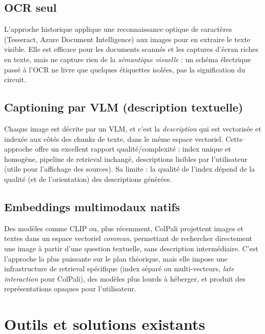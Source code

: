 \subsection{OCR seul}
L'approche historique applique une reconnaissance optique de caractères (Tesseract, Azure
Document Intelligence) aux images pour en extraire le texte visible. Elle est efficace pour
les documents scannés et les captures d'écran riches en texte, mais ne capture rien de la
\emph{sémantique visuelle} : un schéma électrique passé à l'OCR ne livre que quelques
étiquettes isolées, pas la signification du circuit.

\subsection{Captioning par VLM (description textuelle)}
Chaque image est décrite par un VLM, et c'est la \emph{description} qui est vectorisée et
indexée aux côtés des chunks de texte, dans le même espace vectoriel. Cette approche offre
un excellent rapport qualité/complexité : index unique et homogène, pipeline de retrieval
inchangé, descriptions lisibles par l'utilisateur (utile pour l'affichage des sources).
Sa limite : la qualité de l'index dépend de la qualité (et de l'orientation) des
descriptions générées.

\subsection{Embeddings multimodaux natifs}
Des modèles comme CLIP \cite{radford2021clip} ou, plus récemment, ColPali
\cite{faysse2024colpali} projettent images et textes dans un espace vectoriel \emph{commun},
permettant de rechercher directement une image à partir d'une question textuelle, sans
description intermédiaire. C'est l'approche la plus puissante sur le plan théorique, mais
elle impose une infrastructure de retrieval spécifique (index séparé ou multi-vecteurs,
\emph{late interaction} pour ColPali), des modèles plus lourds à héberger, et produit des
représentations opaques pour l'utilisateur.


\section{Outils et solutions existants}
\label{sec:outils}

